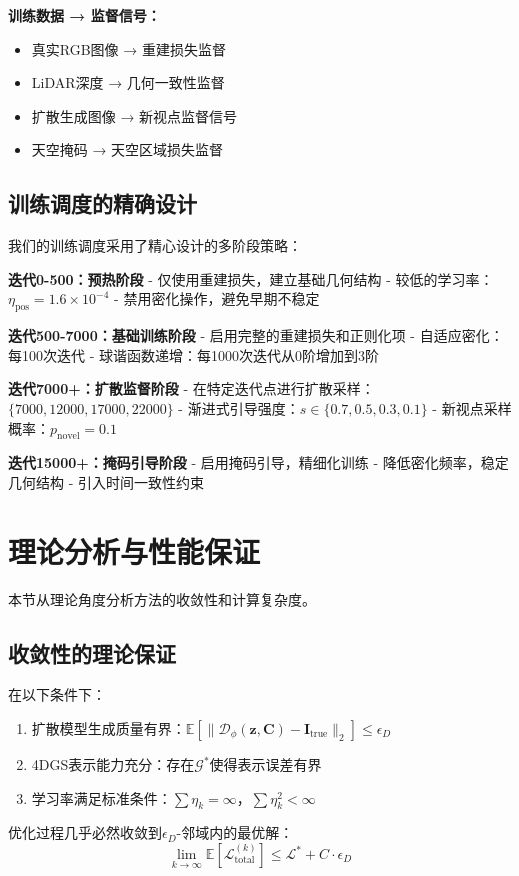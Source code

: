 \textbf{训练数据 → 监督信号：}
\begin{itemize}
\item 真实RGB图像 → 重建损失监督
\item LiDAR深度 → 几何一致性监督  
\item 扩散生成图像 → 新视点监督信号
\item 天空掩码 → 天空区域损失监督
\end{itemize}

\subsection{训练调度的精确设计}

我们的训练调度采用了精心设计的多阶段策略：

\textbf{迭代0-500：预热阶段}
- 仅使用重建损失，建立基础几何结构
- 较低的学习率：$\eta_{\text{pos}} = 1.6 \times 10^{-4}$
- 禁用密化操作，避免早期不稳定

\textbf{迭代500-7000：基础训练阶段}  
- 启用完整的重建损失和正则化项
- 自适应密化：每100次迭代
- 球谐函数递增：每1000次迭代从0阶增加到3阶

\textbf{迭代7000+：扩散监督阶段}
- 在特定迭代点进行扩散采样：$\{7000, 12000, 17000, 22000\}$
- 渐进式引导强度：$s \in \{0.7, 0.5, 0.3, 0.1\}$
- 新视点采样概率：$p_{\text{novel}} = 0.1$

\textbf{迭代15000+：掩码引导阶段}
- 启用掩码引导，精细化训练
- 降低密化频率，稳定几何结构
- 引入时间一致性约束

\section{理论分析与性能保证}

本节从理论角度分析方法的收敛性和计算复杂度。

\subsection{收敛性的理论保证}

\begin{theorem}[多模态损失收敛性]
在以下条件下：
\begin{enumerate}
\item 扩散模型生成质量有界：$\mathbb{E}[\|\mathcal{D}_\phi(\mathbf{z}, \mathbf{C}) - \mathbf{I}_{\text{true}}\|_2] \leq \epsilon_D$
\item 4DGS表示能力充分：存在$\mathcal{G}^*$使得表示误差有界
\item 学习率满足标准条件：$\sum \eta_k = \infty$，$\sum \eta_k^2 < \infty$
\end{enumerate}
优化过程几乎必然收敛到$\epsilon_D$-邻域内的最优解：
\begin{equation}
\lim_{k \to \infty} \mathbb{E}[\mathcal{L}_{\text{total}}^{(k)}] \leq \mathcal{L}^* + C \cdot \epsilon_D
\end{equation}
\end{theorem}

